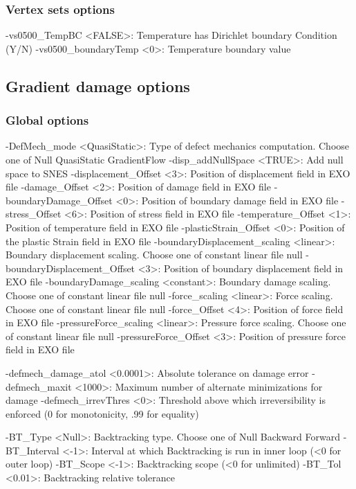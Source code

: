 \documentclass[10pt,oneside]{memoir}
\begin{document}
\subsubsection{Vertex sets options}
\small{\begin{boxedverbatim}
-vs0500_TempBC <FALSE>:   Temperature has Dirichlet boundary Condition (Y/N) 
-vs0500_boundaryTemp <0>: Temperature boundary value 
\end{boxedverbatim}}

\subsection{Gradient damage options}
\subsubsection{Global options}
\small{\begin{boxedverbatim}
-DefMech_mode <QuasiStatic>: Type of defect mechanics computation. 
                             Choose one of Null QuasiStatic GradientFlow
-disp_addNullSpace <TRUE>: Add null space to SNES 
-displacement_Offset <3>: Position of displacement field in EXO file 
-damage_Offset <2>: Position of damage field in EXO file 
-boundaryDamage_Offset <0>: Position of boundary damage field in EXO file 
-stress_Offset <6>: Position of stress field in EXO file 
-temperature_Offset <1>: Position of temperature field in EXO file 
-plasticStrain_Offset <0>: Position of the plastic Strain field in EXO file 
-boundaryDisplacement_scaling <linear>: Boundary displacement scaling.
                                        Choose one of constant linear file null
-boundaryDisplacement_Offset <3>: Position of boundary displacement field in EXO file 
-boundaryDamage_scaling <constant>: Boundary damage scaling.
                                    Choose one of constant linear file null
-force_scaling <linear>: Force scaling. 
                         Choose one of constant linear file null
-force_Offset <4>: Position of force field in EXO file 
-pressureForce_scaling <linear>: Pressure force scaling. 
                                 Choose one of constant linear file null
-pressureForce_Offset <3>: Position of pressure force field in EXO file 

-defmech_damage_atol <0.0001>: Absolute tolerance on damage error 
-defmech_maxit <1000>: Maximum number of alternate minimizations for damage 
-defmech_irrevThres <0>: Threshold above which irreversibility is enforced 
                        (0 for monotonicity, .99 for equality) 

-BT_Type <Null>: Backtracking type.
                 Choose one of Null Backward Forward
-BT_Interval <-1>: Interval at which Backtracking is run in inner loop 
                   (<0 for outer loop) 
-BT_Scope <-1>: Backtracking scope (<0 for unlimited) 
-BT_Tol <0.01>: Backtracking relative tolerance 
\end{boxedverbatim}}
\end{document}
